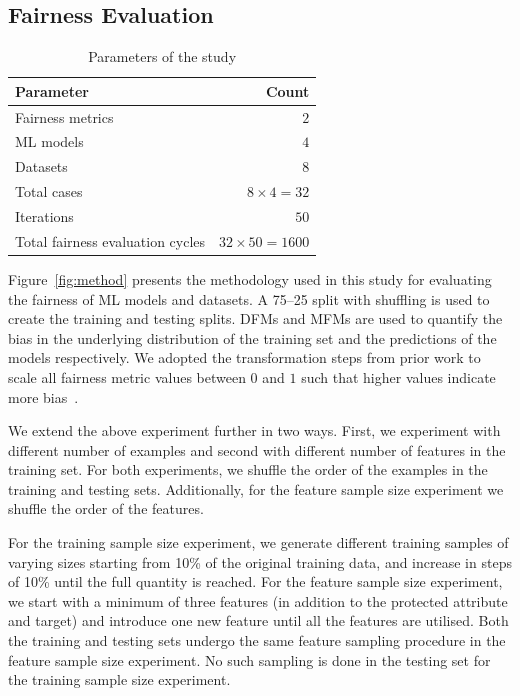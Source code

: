 \documentclass[sigconf]{acmart}
\begin{document}
\subsection{Fairness Evaluation}\label{sec:method-fair-eval}

\begin{table}
  \centering
  \caption{Parameters of the study}
  \begin{tabular}{l r}
    \hline
    \textbf{Parameter} & \textbf{Count}\\
    \hline
    Fairness metrics & $2$\\
    ML models & $4$\\
    Datasets & $8$\\
    Total cases & $8\times4=32$\\
    Iterations & $50$\\
    Total fairness evaluation cycles & $32\times50=1600$\\
    \hline
  \end{tabular}
  \label{tab:parameters}
\end{table}

Figure \ref{fig:method} presents the methodology used in this study
for evaluating the fairness of ML models and datasets. A 75--25 split
with shuffling is used to create the training and testing splits. DFMs
and MFMs are used to quantify the bias in the underlying distribution
of the training set and the predictions of the models respectively. We
adopted the transformation steps from prior work to scale all fairness
metric values between $0$ and $1$ such that higher values indicate
more bias \cite{zhang2021ignorance,hort2021fairea}.

We extend the above experiment further in two ways. First, we
experiment with different number of examples and second with different
number of features in the training set. For both experiments, we
shuffle the order of the examples in the training and testing sets.
Additionally, for the feature sample size experiment we shuffle the
order of the features.

For the training sample size experiment, we generate different
training samples of varying sizes starting from 10\% of the original
training data, and increase in steps of 10\% until the full quantity
is reached. For the feature sample size experiment, we start with
a minimum of three features (in addition to the protected attribute
and target) and introduce one new feature until all the features are
utilised. Both the training and testing sets undergo the same feature
sampling procedure in the feature sample size experiment. No such
sampling is done in the testing set for the training sample size
experiment.
\end{document}

